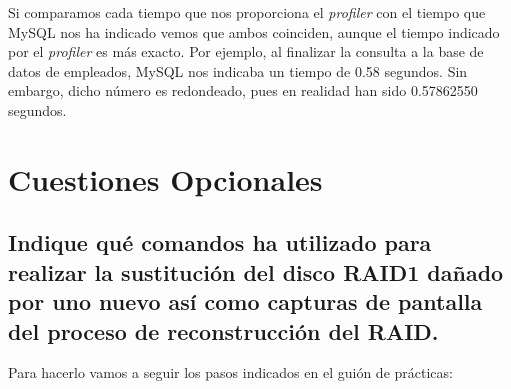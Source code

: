 \documentclass[10pt,a4paper,spanish]{article}
\numberwithin{equation}{section} %
\numberwithin{figure}{section} %
\numberwithin{table}{section} %
\begin{document}
Si comparamos cada tiempo que nos proporciona el \textit{profiler} con el tiempo que MySQL nos ha indicado vemos que ambos coinciden, aunque el tiempo indicado por el \textit{profiler} es más exacto. Por ejemplo, al finalizar la consulta a la base de datos de empleados, MySQL nos indicaba un tiempo de 0.58 segundos. Sin embargo, dicho número es redondeado, pues en realidad han sido 0.57862550 segundos.

\section{Cuestiones Opcionales}
\subsection{Indique qué comandos ha utilizado para realizar la sustitución del disco RAID1 dañado por uno nuevo así como capturas de pantalla del proceso de reconstrucción del RAID.}
Para hacerlo vamos a seguir los pasos indicados en el guión de prácticas:
\end{document}

